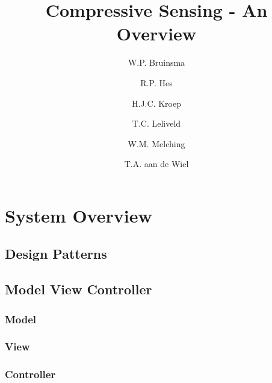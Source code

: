 \documentclass[a4paper, openany, oneside]{memoir}
\title{Compressive Sensing - An Overview}
\author{W.P. Bruinsma \and R.P. Hes \and H.J.C. Kroep \and T.C. Leliveld \and W.M. Melching \and T.A. aan de Wiel}
\begin{document}
\chapter{System Overview}

\section{Design Patterns}
\label{sec:design-patterns}

\section{Model View Controller}
\label{sec:model-view-contr}

\subsection{Model}
\label{sec:model}

\subsection{View}
\label{sec:view}

\subsection{Controller}
\label{sec:controller}
\end{document}
